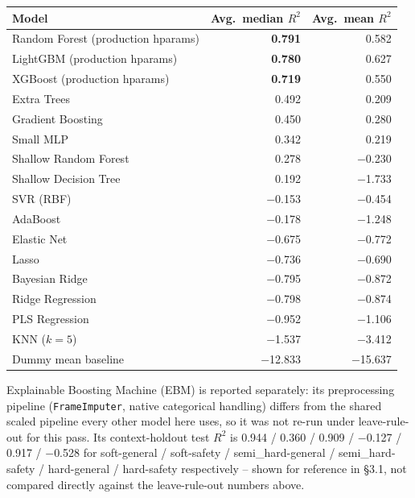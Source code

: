 \documentclass[11pt]{article}
\begin{document}
\begin{center}
\small
\begin{tabular}{lrr}
\toprule
\textbf{Model} & \textbf{Avg.\ median $R^2$} & \textbf{Avg.\ mean $R^2$} \\
\midrule
Random Forest (production hparams)    & \textbf{0.791} & 0.582 \\
LightGBM (production hparams)          & \textbf{0.780} & 0.627 \\
XGBoost (production hparams)           & \textbf{0.719} & 0.550 \\
Extra Trees                            & 0.492 & 0.209 \\
Gradient Boosting                      & 0.450 & 0.280 \\
Small MLP                              & 0.342 & 0.219 \\
Shallow Random Forest                  & 0.278 & $-$0.230 \\
Shallow Decision Tree                  & 0.192 & $-$1.733 \\
SVR (RBF)                              & $-$0.153 & $-$0.454 \\
AdaBoost                               & $-$0.178 & $-$1.248 \\
Elastic Net                            & $-$0.675 & $-$0.772 \\
Lasso                                  & $-$0.736 & $-$0.690 \\
Bayesian Ridge                         & $-$0.795 & $-$0.872 \\
Ridge Regression                       & $-$0.798 & $-$0.874 \\
PLS Regression                         & $-$0.952 & $-$1.106 \\
KNN ($k{=}5$)                          & $-$1.537 & $-$3.412 \\
Dummy mean baseline                    & $-$12.833 & $-$15.637 \\
\bottomrule
\end{tabular}
\end{center}

Explainable Boosting Machine (EBM) is reported separately: its
preprocessing pipeline (\texttt{FrameImputer}, native categorical handling)
differs from the shared scaled pipeline every other model here uses, so it
was not re-run under leave-rule-out for this pass. Its context-holdout test
$R^2$ is 0.944 / 0.360 / 0.909 / $-$0.127 / 0.917 / $-$0.528 for
soft-general / soft-safety / semi\_hard-general / semi\_hard-safety /
hard-general / hard-safety respectively -- shown for reference in \S3.1,
not compared directly against the leave-rule-out numbers above.
\end{document}
